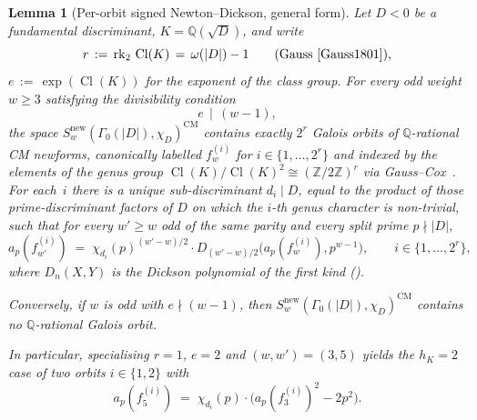 \documentclass[11pt,a4paper]{amsart}
\theoremstyle{plain}
\newtheorem{lemma}[theorem]{Lemma}
\theoremstyle{definition}
\DeclareMathOperator{\Cl}{Cl}
\newcommand{\Q}{\mathbb{Q}}
\newcommand{\Z}{\mathbb{Z}}
\newcommand{\absD}{\lvert D\rvert}
\newcommand{\fl}[2]{f_{#1}^{(#2)}}
\begin{document}
\begin{lemma}[Per-orbit signed Newton--Dickson, general form]\label{lem:NDsigned}
Let $D < 0$ be a fundamental discriminant, $K = \Q(\sqrt{D})$, and write
\[
   r \,:=\, \mathrm{rk}_2\,\Cl(K) \,=\, \omega(\absD) - 1
   \qquad \text{(Gauss \cite[\S\S 225--237]{Gauss1801})},
\]
$e \,:=\, \exp(\Cl(K))$ for the exponent of the class group. For every
odd weight $w \ge 3$ satisfying the divisibility condition
\begin{equation}\label{eq:Lemma-B-hyp}
   e \,\mid\, (w - 1),
\end{equation}
the space
$S_w^{\mathrm{new}}(\Gamma_0(\absD), \chi_D)^{\mathrm{CM}}$ contains
exactly $2^r$ Galois orbits of $\Q$-rational CM newforms,
canonically labelled
$\fl{w}{i}$ for $i \in \{1, \ldots, 2^r\}$ and indexed by the elements of
the genus group $\Cl(K)/\Cl(K)^2 \cong (\Z/2\Z)^r$ via
Gauss--Cox~\cite[Thm.~6.1]{Cox1989}. For each~$i$ there is a unique
sub-discriminant $d_i \mid D$, equal to the product of those
prime-discriminant factors of $D$ on which the $i$-th genus character is
non-trivial, such that for every $w' \ge w$ odd of the same parity and
every split prime $p \nmid \absD$,
\begin{equation}\label{eq:nd-signed}
   a_p(\fl{w'}{i}) \;=\; \chi_{d_i}(p)^{(w'-w)/2} \cdot
     D_{(w'-w)/2}\!\bigl(a_p(\fl{w}{i}), p^{w-1}\bigr),
   \qquad i \in \{1, \ldots, 2^r\},
\end{equation}
where $D_n(X, Y)$ is the Dickson polynomial of the first kind
\textup{(\cite{Lidl1993})}.

Conversely, if $w$ is odd with $e \nmid (w-1)$, then
$S_w^{\mathrm{new}}(\Gamma_0(\absD), \chi_D)^{\mathrm{CM}}$ contains
\emph{no} $\Q$-rational Galois orbit.

In particular, specialising $r = 1$, $e = 2$ and $(w, w') = (3, 5)$
yields the $h_K = 2$ case of two orbits $i \in \{1, 2\}$ with
\[
   a_p(\fl{5}{i}) \;=\; \chi_{d_i}(p) \cdot
     \bigl(a_p(\fl{3}{i})^2 - 2 p^2\bigr).
\]
\end{lemma}
\end{document}
